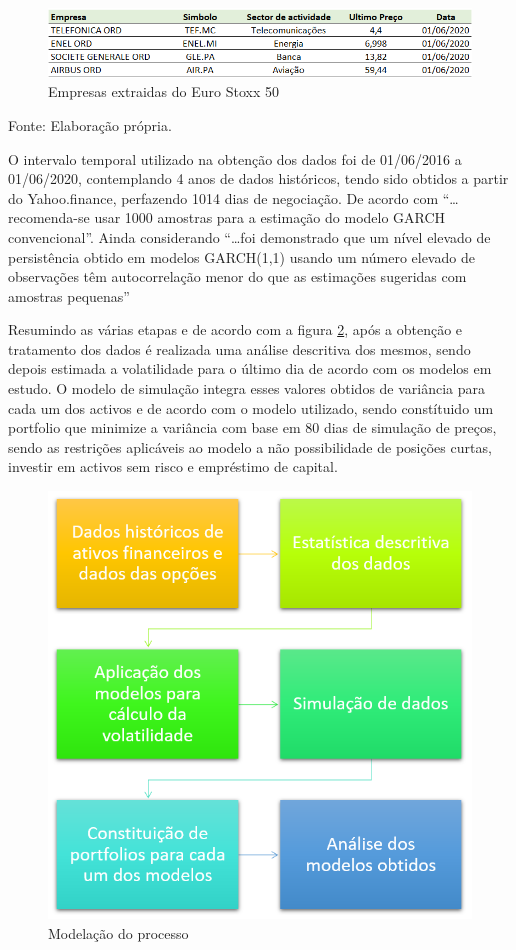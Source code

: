 \documentclass[
  12pt,
  a4paper,
  openany]{book}
\begin{document}
\begin{figure}

{\centering \includegraphics[width=1\linewidth]{image/cotacao} 

}

\caption{Empresas extraidas do Euro Stoxx 50}\label{fig:empresas}
\end{figure}
\FloatBarrier
\centering

Fonte: Elaboração própria.

\justifying
\bigskip

O intervalo temporal utilizado na obtenção dos dados foi de 01/06/2016 a 01/06/2020, contemplando 4
anos de dados históricos, tendo sido obtidos a partir do Yahoo.finance, perfazendo 1014 dias de negociação. De acordo com \citet{NG2006} ``\ldots recomenda-se usar 1000 amostras para a estimação do modelo GARCH convencional''. Ainda considerando \citet{smallsample} ``\ldots foi demonstrado que um nível elevado de persistência obtido em modelos GARCH(1,1) usando um número elevado de observações têm autocorrelação menor do que as estimações sugeridas com amostras pequenas''

Resumindo as várias etapas e de acordo com a figura \ref{fig:processo}, após a obtenção e tratamento dos dados é realizada uma análise descritiva dos mesmos, sendo depois estimada a volatilidade para o último dia de acordo com os modelos em estudo. O modelo de simulação integra esses valores obtidos de variância para cada um dos activos e de acordo com o modelo utilizado, sendo constítuido um portfolio que minimize a variância com base em 80 dias de simulação de preços, sendo as restrições aplicáveis ao modelo a não possibilidade de posições curtas, investir em activos sem risco e empréstimo de capital.

\begin{figure}

{\centering \includegraphics[width=0.6\linewidth]{image/modelação} 

}

\caption{Modelação do processo}\label{fig:processo}
\end{figure}
\FloatBarrier
\centering
\end{document}
